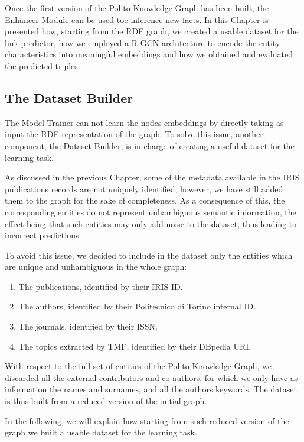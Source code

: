 \documentclass[%
    corpo=13.5pt,
    twoside,
    oldstyle,
    tipotesi=magistrale,
    greek,
    evenboxes
]{toptesi}
\begin{document}
Once the first version of the Polito Knowledge Graph has been built, the
Enhancer Module can be used toe inference new facts. In this Chapter is
presented how, starting from the RDF graph, we created a usable dataset
for the link predictor, how we employed a R-GCN architecture to encode the
entity characteristics into meaningful embeddings and how we obtained and
evaluated the predicted triples.


\subsection{The Dataset Builder}

The Model Trainer can not learn the nodes embeddings by directly taking as input
the RDF representation of the graph.
To solve this issue, another component, the Dataset Builder, is in charge of
creating a useful dataset for the learning task.

As discussed in the previous Chapter, some of the metadata available
in the IRIS publications records are not uniquely identified, however, we
have still added them to the graph for the sake of completeness.
As a consequence of this, the corresponding entities do not represent
unhambiguous semantic information, the effect being that such entities may
only add noise to the dataset, thus leading to incorrect predictions.

To avoid this issue, we decided to include in the dataset only the entities
which are unique and unhambiguous in the whole graph:

\begin{enumerate}
    \item The publications, identified by their IRIS ID.
    \item The authors, identified by their Politecnico di
        Torino internal ID.
    \item The journals, identified by their ISSN.
    \item The topics extracted by TMF, identified by their DBpedia
        URI.
\end{enumerate}

With respect to the full set of entities of the Polito Knowledge Graph, we
discarded all the external contributors and co-authors, for which we only have
as information the names and surnames, and all the authors keywords.
The dataset is thus built from a reduced version of the initial graph.

In the following, we will explain how starting from such reduced version of the
graph we built a usable dataset for the learning task.
\newline
\end{document}
